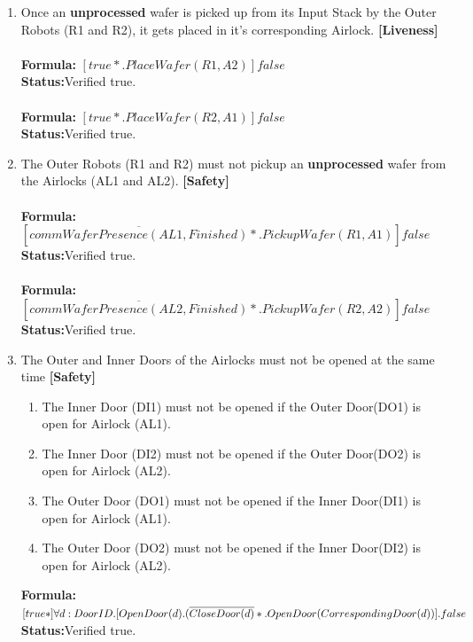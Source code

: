 \documentclass[a4paper,12pt]{article}
\begin{document}
\begin{enumerate}
		
		\item Once an \textbf{unprocessed} wafer is picked up from its Input Stack by the Outer Robots (R1 and R2), it gets placed in it's corresponding Airlock. \textbf{[Liveness]}
		\\
		\\\textbf{Formula:} $[true*.PlaceWafer(R1,A2)] false $ \\\textbf{Status:}Verified true.
		\\
		\\\textbf{Formula:} $[true*.PlaceWafer(R2,A1)] false $ \\\textbf{Status:}Verified true.
		
		
		\item The Outer Robots (R1 and R2) must not pickup an \textbf{unprocessed} wafer from the Airlocks (AL1 and AL2). \textbf{[Safety]}
		\\
		\\\textbf{Formula:} $[\overline{commWaferPresence(AL1,Finished)}*.PickupWafer(R1,A1)]false $ \\\textbf{Status:}Verified true.
		\\
		\\\textbf{Formula:} $[\overline{commWaferPresence(AL2,Finished)}*.PickupWafer(R2,A2)]false $ \\\textbf{Status:}Verified true.
		
		
		
		\item The Outer and Inner Doors of the Airlocks must not be opened at the same time \textbf{[Safety]}
		\begin{enumerate}
			\item The Inner Door (DI1) must not be opened if the Outer Door(DO1) is open for Airlock (AL1).
			
			\item The Inner Door (DI2) must not be opened if the Outer Door(DO2) is open for Airlock (AL2).
			
			\item The Outer Door (DO1) must not be opened if the Inner Door(DI1) is open for Airlock (AL1).
			
			\item The Outer Door (DO2) must not be opened if the Inner Door(DI2) is open for Airlock (AL2).
		\end{enumerate}
		
		\textbf{Formula:} $[true*] \forall d: DoorID.[OpenDoor(d).
		\\(\overline{CloseDoor(d)}*.OpenDoor(CorrespondingDoor(d))].false$ \\\textbf{Status:}Verified true.
		

\end{enumerate}
\end{document}
